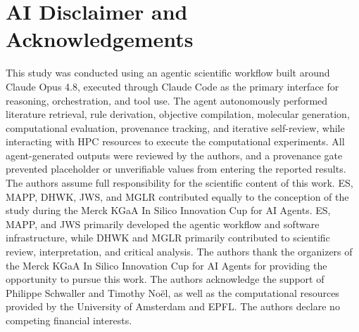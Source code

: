 \documentclass[10pt]{article}
\begin{document}
\section*{AI Disclaimer and Acknowledgements}
{\footnotesize
This study was conducted using an agentic scientific workflow built around Claude Opus 4.8, executed through Claude Code as the primary interface for reasoning, orchestration, and tool use. The agent autonomously performed literature retrieval, rule derivation, objective compilation, molecular generation, computational evaluation, provenance tracking, and iterative self-review, while interacting with HPC resources to execute the computational experiments. All agent-generated outputs were reviewed by the authors, and a provenance gate prevented placeholder or unverifiable values from entering the reported results. The authors assume full responsibility for the scientific content of this work. ES, MAPP, DHWK, JWS, and MGLR contributed equally to the conception of the study during the Merck KGaA In Silico Innovation Cup for AI Agents. ES, MAPP, and JWS primarily developed the agentic workflow and software infrastructure, while DHWK and MGLR primarily contributed to scientific review, interpretation, and critical analysis. The authors thank the organizers of the Merck KGaA In Silico Innovation Cup for AI Agents for providing the opportunity to pursue this work. The authors acknowledge the support of Philippe Schwaller and Timothy Noël, as well as the computational resources provided by the University of Amsterdam and EPFL. The authors declare no competing financial interests.
}
\end{document}
